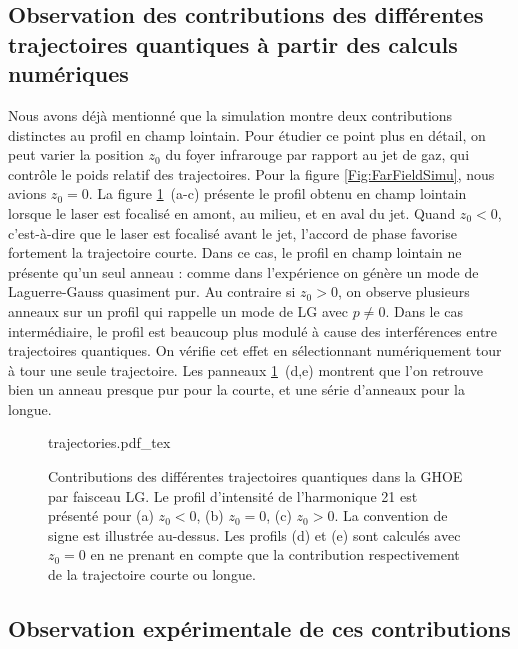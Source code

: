 \subsection{Observation des contributions des différentes trajectoires quantiques à partir des calculs numériques}
Nous avons déjà mentionné que la simulation montre deux contributions distinctes au profil en champ lointain. Pour étudier ce point plus en détail, on peut varier la position $z_0$ du foyer infrarouge par rapport au jet de gaz, qui contrôle le poids relatif des trajectoires. Pour la figure \ref{Fig:FarFieldSimu}, nous avions $z_0=0$. La figure \ref{Fig:H21_traj}~(a-c) présente le profil obtenu en champ lointain lorsque le laser est focalisé en amont, au milieu, et en aval du jet. Quand $z_0<0$, c'est-à-dire que le laser est focalisé avant le jet, l'accord de phase favorise fortement la trajectoire courte. Dans ce cas, le profil en champ lointain ne présente qu'un seul anneau : comme dans l'expérience on génère un mode de Laguerre-Gauss quasiment pur. Au contraire si $z_0>0$, on observe plusieurs anneaux sur un profil qui rappelle un mode de LG avec $p\neq 0$. Dans le cas intermédiaire, le profil est beaucoup plus modulé à cause des interférences entre trajectoires quantiques. On vérifie cet effet en sélectionnant numériquement tour à tour une seule trajectoire. Les panneaux \ref{Fig:H21_traj}~(d,e) montrent que l'on retrouve bien un anneau presque pur pour la courte, et une série d'anneaux pour la longue.


\begin{figure}[!ht]
\centering
\def\svgwidth{.7\columnwidth}
{trajectories.pdf_tex}
\caption{Contributions des différentes trajectoires quantiques dans la GHOE par faisceau LG. Le profil d'intensité de l'harmonique 21 est présenté pour (a) $z_0<0$, (b) $z_0=0$, (c) $z_0>0$. La convention de signe est illustrée au-dessus. Les profils (d) et (e) sont calculés avec $z_0=0$ en ne prenant en compte que la contribution respectivement de la trajectoire courte ou longue.}
\label{Fig:H21_traj}
\end{figure}

\subsection{Observation expérimentale de ces contributions}
